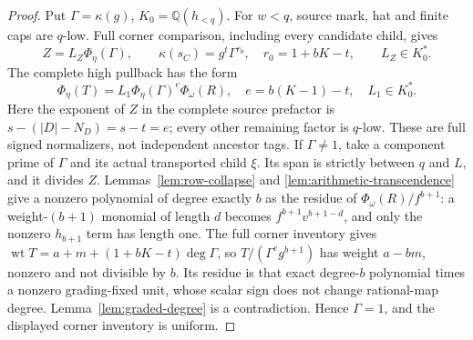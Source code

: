 \documentclass[11pt,a4paper]{amsart}
\numberwithin{equation}{section}
\theoremstyle{plain}
\theoremstyle{definition}
\begin{document}
\begin{proof}
Put \(\Gamma=\kappa(g)\), \(K_0=\mathbb Q(h_{<q})\).  For \(w<q\), source mark, hat and finite caps are \(q\)-low.  Full corner comparison, including every candidate child, gives
\[
 Z=L_Z\Phi_\eta(\Gamma),\qquad
 \kappa(s_C)=g^t\Gamma^{r_0},\quad r_0=1+bK-t,
 \qquad L_Z\in K_0^*.
\]
The complete high pullback has the form
\[
 \Phi_\eta(T)=L_1\Phi_\eta(\Gamma)^e\Phi_\omega(R),
 \quad e=b(K-1)-t,\quad L_1\in K_0^*.
\]
Here the exponent of \(Z\) in the complete source prefactor is \(s-(|D|-N_D)=s-t=e\); every other remaining factor is \(q\)-low.  These are full signed normalizers, not independent ancestor tags.  If \(\Gamma\ne1\), take a component prime of \(\Gamma\) and its actual transported child \(\xi\).  Its span is strictly between \(q\) and \(L\), and it divides \(Z\).  Lemmas~\ref{lem:row-collapse} and \ref{lem:arithmetic-transcendence} give a nonzero polynomial of degree exactly \(b\) as the residue of \(\Phi_\omega(R)/f^{b+1}\): a weight-\((b+1)\) monomial of length \(d\) becomes \(f^{b+1}v^{b+1-d}\), and only the nonzero \(h_{b+1}\) term has length one.  The full corner inventory gives \(\operatorname{wt}T=a+m+(1+bK-t)\deg\Gamma\), so \(T/(\Gamma^eg^{b+1})\) has weight \(a-bm\), nonzero and not divisible by \(b\).  Its residue is that exact degree-\(b\) polynomial times a nonzero grading-fixed unit, whose scalar sign does not change rational-map degree.  Lemma~\ref{lem:graded-degree} is a contradiction.  Hence \(\Gamma=1\), and the displayed corner inventory is uniform.


\end{proof}
\end{document}

